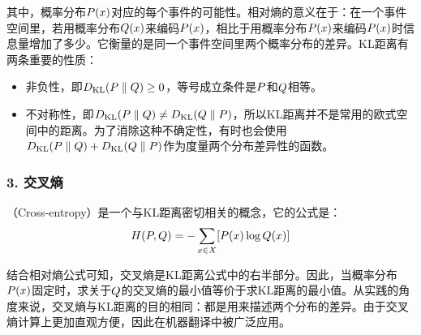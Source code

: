\parinterval 其中，概率分布${P}(x)$对应的每个事件的可能性。相对熵的意义在于：在一个事件空间里，若用概率分布${Q}(x)$来编码${P}(x)$，相比于用概率分布${P}(x)$来编码${P}(x)$时信息量增加了多少。它衡量的是同一个事件空间里两个概率分布的差异。KL距离有两条重要的性质：

\begin{itemize}
\vspace{0.5em}
\item 非负性，即${D}_{\textrm{KL}} ({P} \parallel {Q}) \ge 0$，等号成立条件是${P}$和${Q}$相等。
\vspace{0.5em}
\item 不对称性，即${D}_{\textrm{KL}} ({P} \parallel {Q}) \neq {D}_{\textrm{KL}} ({Q}  \parallel {P})$，所以$\textrm{KL}$距离并不是常用的欧式空间中的距离。为了消除这种不确定性，有时也会使用${D}_{\textrm{KL}} ({P}  \parallel {Q})+{D}_{\textrm{KL}} ({Q}  \parallel {P})$作为度量两个分布差异性的函数。
\vspace{0.5em}
\end{itemize}


\subsubsection{3. 交叉熵}

（Cross-entropy）是一个与KL距离密切相关的概念，它的公式是：
\begin{eqnarray}
{H}({P},{Q})=-\sum_{x \in X} [{P}(x) \log {Q}(x) ]
\label{eq:2-16}
\end{eqnarray}

\parinterval 结合相对熵公式可知，交叉熵是KL距离公式中的右半部分。因此，当概率分布${P}(x)$固定时，求关于${Q}$的交叉熵的最小值等价于求KL距离的最小值。从实践的角度来说，交叉熵与KL距离的目的相同：都是用来描述两个分布的差异。由于交叉熵计算上更加直观方便，因此在机器翻译中被广泛应用。


